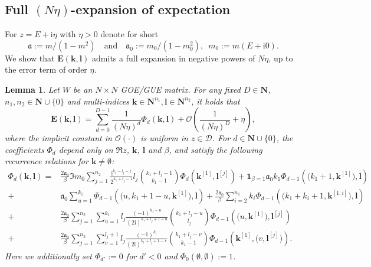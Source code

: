 \documentclass[10pt]{amsart}
\newtheorem{lemma}[theorem]{Lemma}
\numberwithin{equation}{section}
\newcommand{\E}{\mathbf{E}}
\newcommand{\N}{\mathbf{N}}
\newcommand{\ma}{\mathfrak{a}}
\newcommand{\ii}{\mathrm{i}}
\begin{document}
\subsection{Full $(N\eta)$-expansion of expectation}\label{sec:E_expansion} For $z=E+\ii\eta$ with $\eta>0$ denote for short
\begin{equation}
\mathfrak{a}:=m/(1-m^2)\quad \text{and}\quad \mathfrak{a}_0:=m_0/(1-m^2_0),\,\,\, m_0:=m(E+\ii 0).
\label{eq:def_a} 
\end{equation}
We show that $\E(\bm{k},\bm{l})$ admits a full expansion in negative powers of $N\eta$, up to the error term of order $\eta$.
\begin{lemma}\label{lem:E_full_expansion} Let $W$ be an $N\times N$ GOE/GUE matrix. For any fixed $D\in\N$, $n_1,n_2\in\N\cup\{0\}$ and multi-indices $\bm{k}\in \N^{n_1},\bm{l}\in\N^{n_2}$, it holds that
\begin{equation}
\E\left(\bm{k},\bm{l}\right) = \sum_{d=0}^{D-1} \frac{1}{(N\eta)^d}\Phi_d\left(\bm{k},\bm{l}\right) + \mathcal{O}\left(\frac{1}{(N\eta)^D}+\eta\right),
\label{eq:E_full_expansion}
\end{equation}
where the implicit constant in $\mathcal{O}(\cdot)$ is uniform in $z\in\mathcal{D}$. For $d\in \N\cup\{0\}$, the coefficients $\Phi_d$ depend only on $\Re z$, $\bm{k}$, $\bm{l}$ and $\beta$, and satisfy the following recurrence relations for $\bm{k}\neq\emptyset$:
\begin{equation}
\begin{split}
\Phi_d(\bm{k},\bm{l})=&\frac{2\ma_0}{\beta}\Im m_0 \sum_{j=1}^{n_2} \frac{\ii^{k_1-l_j-1}}{2^{k_1+l_j-1}} l_j\binom{k_1+l_j-1}{k_1-1} \Phi_d\left(\bm{k}^{[1]},\bm{l}^{[j]}\right)+\bm{1}_{\beta=1}\ma_0 k_1\Phi_{d-1}\left(\big(k_1+1,\bm{k}^{[1]}\big),\bm{l}\right)\\
+& \ma_0 \sum_{u=1}^{k_1} \Phi_{d-1}\left(\big(u,k_1+1-u,\bm{k}^{[1]}\big),\bm{l}\right)+\frac{2\ma_0}{\beta} \sum_{i=2}^{n_1} k_i \Phi_{d-1}\left(\big(k_1+k_i+1,\bm{k}^{[1,i]}\big),\bm{l}\right)\\
+&\frac{2\ma_0}{\beta} \sum_{j=1}^{n_2} \sum_{u=1}^{k_1} l_j \frac{(-1)^{k_1-u}}{(2\ii)^{k_1+l_j+1-u}} \binom{k_1+l_j-u}{l_j}\Phi_{d-1}\left( \big(u, \bm{k}^{[1]}\big), \bm{l}^{[j]}\right)\\
+&\frac{2\ma_0}{\beta} \sum_{j=1}^{n_2} \sum_{v=1}^{l_j+1} l_j\frac{(-1)^{k_1}}{(2\ii)^{k_1+l_j+1-v}}\binom{k_1+l_j-v}{k_1-1}\Phi_{d-1}\left(\bm{k}^{[1]},\big(v,\bm{l}^{[j]}\big)\right).
\end{split}
\label{eq:Phi_recursion}
\end{equation}
Here we additionally set $\Phi_{d'}:=0$ for $d'<0$ and $\Phi_0(\emptyset,\emptyset):=1$.
\end{lemma}
\end{document}
